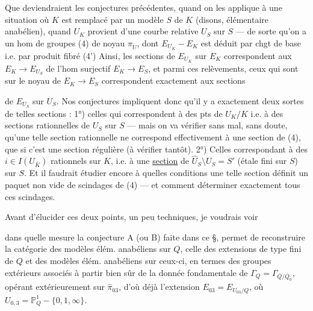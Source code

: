 Que deviendraient les conjectures précédentes, quand on les applique à une situation où $K$ est remplacé par un modèle $S$ de $K$ (disons, élémentaire anabélien), quand $U_K$ provient d'une courbe relative $U_S$ sur $S$ — de sorte qu'on a un hom de groupes
(4)\quad{}
de noyau $\pi_{\bar U}$, dont $E_{U_K}-E_K$ est déduit par chgt de base i.e. par produit fibré
(4')\quad{}
Ainsi, les sections de $E_{U_K}$ sur $E_K$ correspondent aux   $E_K\longrightarrow E_{U_S}$ de l'hom surjectif $E_K\longrightarrow E_S$, et parmi ces relèvements, ceux qui sont  sur le noyau de $E_K\longrightarrow E_S$ correspondent exactement aux sections

de $E_{U_S}$ sur $U_S$. Nos conjectures impliquent donc qu'il y a exactement deux sortes de telles sections : 1°) celles qui correspondent à des pts de $U_K/K$ i.e. à des sections rationnelles de $U_S$ sur $S$ — mais on va vérifier sans mal, sans doute, qu'une telle section rationnelle ne correspond effectivement à une section de  (4), que si c'est une section  régulière (à vérifier tantôt). 2°) Celles correspondant à des $i\in I(U_{\bar K})$ rationnels sur $K$, i.e. à une \uline{section} de $\widehat U_S\setminus U_S=S'$ (étale fini sur $S$) sur $S$. Et il faudrait étudier encore à quelles conditions une telle section définit un paquet non vide de scindages de (4) — et comment déterminer exactement tous ces scindages.

Avant d'élucider ces deux points, un peu techniques, je voudrais voir

dans quelle mesure la conjecture A (ou B) faite dans ce §, permet de reconstruire la catégorie des modèles élém. anabéliens sur $Q$,  celle des extensions de type fini de $Q$ et des modèles élém. anabéliens sur ceux-ci, en termes des groupes extérieurs  associés à partir bien sûr de la donnée fondamentale de $\Gamma_Q=\Gamma_{\bar Q/\bar Q_0}$, opérant extérieurement sur $\widehat\pi_{03}$, d'où déjà l'extension $E_{03}=E_{U_{03}/Q}$, où $U_{0,3}=\mathbb P^1_Q-\{0,1,\infty\}$.

